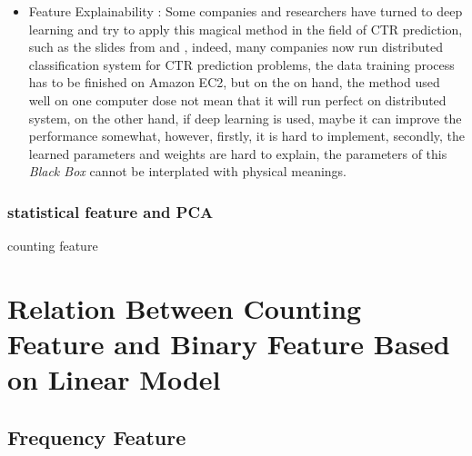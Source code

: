 \begin{itemize}
    \item Feature Explainability : Some companies and researchers have turned to deep learning and try to apply this magical method in the field of CTR prediction, such as the slides from \cite{deeplearning} and \cite{wang2014collaborative}, indeed, many companies now run distributed classification system for CTR prediction problems, the data training process has to be finished on Amazon EC2, but on the on hand, the method used well on one computer dose not mean that it will run perfect on distributed system, on the other hand, if deep learning is used, maybe it can improve the performance somewhat, however, firstly, it is hard to implement, secondly, the learned parameters and weights are hard to explain, the parameters of this \textit{Black Box} cannot be interplated with physical meanings.  
    
\end{itemize}

\subsubsection{statistical feature and PCA}

counting feature































\section{Relation Between Counting Feature and Binary Feature Based on Linear Model}
\subsection{Frequency Feature}
\setlength{\parindent}{5ex}

